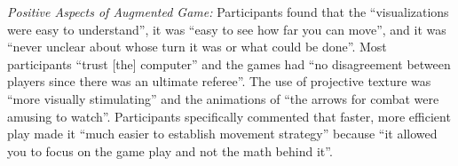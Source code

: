 
{\em Positive Aspects of Augmented Game:} %
%
%
%
%
Participants found that the ``visualizations were easy to understand'',
it was
``easy to see how far you can move'',
and it was ``never unclear about whose turn it was or what could be done''.
%
Most participants ``trust [the] computer'' and the games had
``no disagreement between players since there was an ultimate referee''.
%
The use of projective texture was  ``more visually stimulating''
and the animations of
``the arrows for combat were amusing to watch''.
%
Participants specifically commented that faster, more
efficient play made it ``much easier to establish movement strategy''
because ``it allowed you to focus on the game play and not the math
behind it''.


